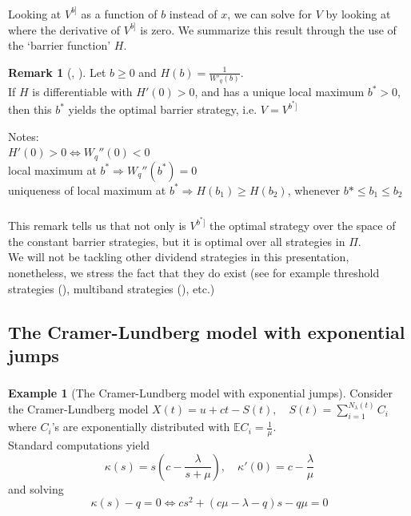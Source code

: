 \documentclass[xcolor=pdftex,dvipsnames,table]{beamer}
\theoremstyle{definition}
\newtheorem*{ex}{Example}
\newtheorem*{rmk}{Remark}
\def\lt{\left}
\def\rt{\right}
\def\mbbE{\mathbb{E}}
\begin{document}
\begin{frame}
\frametitle{\insertsectionhead}
Looking at $V^{b]}$ as a function of $b$ instead of $x$, we can solve for $V$ by looking at where the derivative of $V^{b]}$ is zero. We summarize this result through the use of the `barrier function' $H$.
\begin{rmk}[\cite{APP}, \cite{Loef08}]
Let $b \geq 0$ and $H(b) = \frac{1}{W'_q (b)}$.\\
If $H$ is differentiable with $H'(0) > 0$, and has a unique local maximum $b^*>0$, then this $b^*$ yields the optimal barrier strategy, i.e. $V= V^{b^*]}$
\end{rmk}
Notes:\\
$H'(0) > 0 \iff W_q''(0)<0$\\
local maximum at $b^* \Rightarrow W_q''(b^*) =0$\\
uniqueness of local maximum at $b^* \Rightarrow H(b_1) \geq H(b_2)$, whenever $b* \leq b_1 \leq b_2$
\end{frame}

\begin{frame}
\frametitle{\insertsectionhead}
This remark tells us that not only is $V^{b^*]}$ the optimal strategy over the space of the constant barrier strategies, but it is optimal over all strategies in $\Pi$.\\
\bigskip
We will not be tackling other dividend strategies in this presentation, nonetheless, we stress the fact that they do exist (see for example threshold strategies (\cite{gerber2004optimal}), multiband strategies (\cite{AM05}), etc.)
\end{frame}

\subsection{The Cramer-Lundberg model with exponential jumps}
\begin{frame}
\frametitle{\insertsectionhead}
\begin{ex}[The Cramer-Lundberg model with exponential jumps]
\label{CLexpo}
Consider the Cramer-Lundberg model $ X(t) = u + ct - S(t), \quad S(t) = \sum_{i=1}^{N_\lambda (t)} C_i $\\
where $C_i$'s are exponentially distributed with $\mbbE C_i = \frac{1}{\mu}$.\\
\bigskip
Standard computations yield
\[
\kappa(s)= s \lt( c- \frac{\lambda}{s + \mu} \rt), \quad \kappa'(0) = c - \frac{\lambda}{\mu}
\]
and solving
\[
\kappa(s)-q = 0 \iff cs^2 + (c\mu -\lambda -q ) s -q\mu = 0
\] 
\end{ex}
\end{frame}
\end{document}
